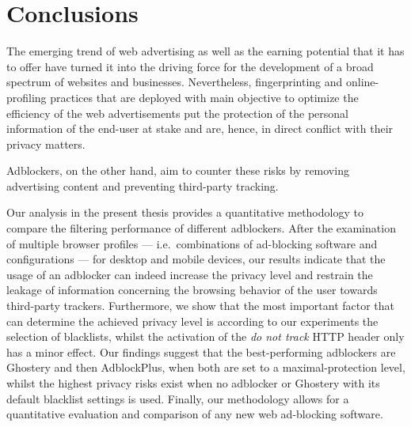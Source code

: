 \chapter{Conclusions}
\label{sec:conclusions}
The emerging trend of web advertising as well as the earning potential that it has to offer have turned it into the driving force for the development of a broad spectrum of websites and businesses. Nevertheless, fingerprinting and online-profiling practices that are deployed with main objective to optimize the efficiency of the web advertisements put the protection of the personal information of the end-user at stake and are, hence, in direct conflict with their privacy matters.

Adblockers, on the other hand, aim to counter these risks by removing advertising content and preventing third-party tracking.

Our analysis in the present thesis provides a quantitative methodology to compare the filtering performance of different adblockers. After the examination of multiple browser profiles --- i.e.\ combinations of ad-blocking software and configurations --- for desktop and mobile devices, our results indicate that the usage of an adblocker can indeed increase the privacy level and restrain the leakage of information concerning the browsing behavior of the user towards third-party trackers. Furthermore, we show that the most important factor that can determine the achieved privacy level is according to our experiments the selection of blacklists, whilst the activation of the \textit{do not track} HTTP header only has a minor effect. Our findings suggest that the best-performing adblockers are Ghostery and then AdblockPlus, when both are set to a maximal-protection level, whilst the highest privacy risks exist when no adblocker or Ghostery with its default blacklist settings is used. Finally, our methodology allows for a quantitative evaluation and comparison of any new web ad-blocking software.
